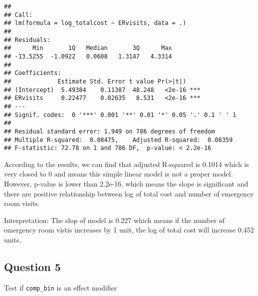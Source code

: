 \documentclass[]{article}
\newenvironment{Shaded}{\begin{snugshade}}{\end{snugshade}}
\newcommand{\KeywordTok}[1]{\textcolor[rgb]{0.13,0.29,0.53}{\textbf{#1}}}
\newcommand{\DataTypeTok}[1]{\textcolor[rgb]{0.13,0.29,0.53}{#1}}
\newcommand{\StringTok}[1]{\textcolor[rgb]{0.31,0.60,0.02}{#1}}
\newcommand{\CommentTok}[1]{\textcolor[rgb]{0.56,0.35,0.01}{\textit{#1}}}
\newcommand{\OperatorTok}[1]{\textcolor[rgb]{0.81,0.36,0.00}{\textbf{#1}}}
\newcommand{\NormalTok}[1]{#1}
\begin{document}
\begin{verbatim}
## 
## Call:
## lm(formula = log_totalcost ~ ERvisits, data = .)
## 
## Residuals:
##      Min       1Q   Median       3Q      Max 
## -13.5255  -1.0922   0.0608   1.3147   4.3314 
## 
## Coefficients:
##             Estimate Std. Error t value Pr(>|t|)    
## (Intercept)  5.49384    0.11387  48.248   <2e-16 ***
## ERvisits     0.22477    0.02635   8.531   <2e-16 ***
## ---
## Signif. codes:  0 '***' 0.001 '**' 0.01 '*' 0.05 '.' 0.1 ' ' 1
## 
## Residual standard error: 1.949 on 786 degrees of freedom
## Multiple R-squared:  0.08475,    Adjusted R-squared:  0.08359 
## F-statistic: 72.78 on 1 and 786 DF,  p-value: < 2.2e-16
\end{verbatim}

According to the results, we can find that adjusted R-squared is 0.1014
which is very closed to 0 and means this simple linear model is not a
proper model. However, p-value is lower than 2.2e-16, which means the
slope is significant and there are positive relationship between log of
total cost and number of emergency room visits.

Interpretation: The slop of model is 0.227 which means if the number of
emergency room vistis increases by 1 unit, the log of total cost will
increase 0.452 units.

\subsection{Question 5}\label{question-5}

Test if \texttt{comp\_bin} is an effect modifier

\begin{Shaded}
\end{Shaded}
\end{document}
